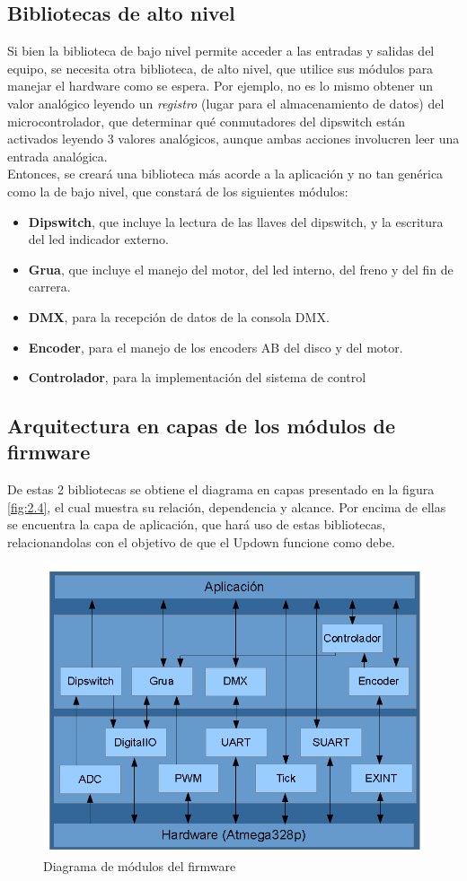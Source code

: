 \subsection{Bibliotecas de alto nivel}
Si bien la biblioteca de bajo nivel permite acceder a las entradas y salidas del equipo, se necesita otra biblioteca, de alto nivel, que utilice sus módulos para manejar el hardware como se espera. Por ejemplo, no es lo mismo obtener un valor analógico leyendo un \textit{registro} (lugar para el almacenamiento de datos) del microcontrolador, que determinar qué conmutadores del dipswitch están activados leyendo 3 valores analógicos, aunque ambas acciones involucren leer una entrada analógica.\\
Entonces, se creará una biblioteca más acorde a la aplicación y no tan genérica como la de bajo nivel, que constará de los siguientes módulos:
\begin{itemize}
	\item \textbf{Dipswitch}, que incluye la lectura de las llaves del dipswitch, y la escritura del led indicador externo.
	\item \textbf{Grua}, que incluye el manejo del motor, del led interno, del freno y del fin de carrera.
	\item \textbf{DMX}, para la recepción de datos de la consola DMX.
	\item \textbf{Encoder}, para el manejo de los encoders AB del disco y del motor.
	\item \textbf{Controlador}, para la implementación del sistema de control
\end{itemize}

\subsection{Arquitectura en capas de los módulos de firmware}
De estas 2 bibliotecas se obtiene el diagrama en capas presentado en la figura \ref{fig:2.4}, el cual muestra su relación, dependencia y alcance. Por encima de ellas se encuentra la capa de aplicación, que hará uso de estas bibliotecas, relacionandolas con el objetivo de que el Updown funcione como debe.

\begin{figure}[!ht]
	\centering
	\includegraphics[width=14cm,scale=1]{resources/2_4-diagramaDeModulos.png}
	\caption{Diagrama de módulos del firmware}
	\label{fig:\thefigure}
\end{figure}
